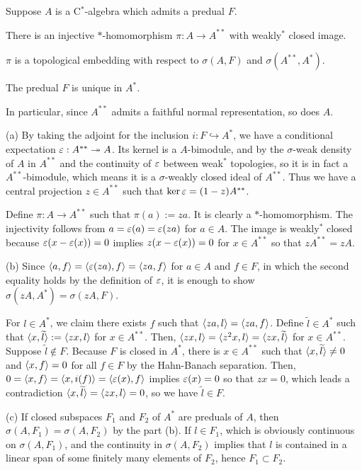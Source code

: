 \documentclass{../../large}
\begin{document}
\begin{prb}
Suppose $A$ is a C$^*$-algebra which admits a predual $F$.
\begin{parts}
\item There is an injective $*$-homomorphism $\pi:A\to A^{**}$ with weakly$^*$ closed image.
\item $\pi$ is a topological embedding with respect to $\sigma(A,F)$ and $\sigma(A^{**},A^*)$.
\item The predual $F$ is unique in $A^*$.
\end{parts}
In particular, since $A^{**}$ admits a faithful normal representation, so does $A$.
\end{prb}
\begin{pf}
(a)
By taking the adjoint for the inclusion $i:F\hookrightarrow A^*$, we have a conditional expectation $\varepsilon:A^{**}\twoheadrightarrow A$.
Its kernel is a $A$-bimodule, and by the $\sigma$-weak density of $A$ in $A^{**}$ and the continuity of $\varepsilon$ between weak$^*$ topologies, so it is in fact a $A^{**}$-bimodule, which means it is a $\sigma$-weakly closed ideal of $A^{**}$.
Thus we have a central projection $z\in A^{**}$ such that $\ker\varepsilon=(1-z)A^{**}$.

Define $\pi:A\to A^{**}$ such that $\pi(a):=za$.
It is clearly a $*$-homomorphism.
The injectivity follows from $a=\varepsilon(a)=\varepsilon(za)$ for $a\in A$.
The image is weakly$^*$ closed because $\varepsilon(x-\varepsilon(x))=0$ implies $z(x-\varepsilon(x))=0$ for $x\in A^{**}$ so that $zA^{**}=zA$.

(b)
Since $\langle a,f\rangle=\langle\varepsilon(za),f\rangle=\langle za,f\rangle$ for $a\in A$ and $f\in F$, in which the second equality holds by the definition of $\varepsilon$, it is enough to show $\sigma(zA,A^*)=\sigma(zA,F)$.

For $l\in A^*$, we claim there exists $f$ such that $\langle za,l\rangle=\langle za,f\rangle$.
Define $\tilde l\in A^*$ such that $\langle x,\widetilde l\rangle:=\langle zx,l\rangle$ for $x\in A^{**}$.
Then, $\langle zx,l\rangle=\langle z^2x,l\rangle=\langle zx,\widetilde l\rangle$ for $x\in A^{**}$.
Suppose $\tilde l\notin F$.
Because $F$ is closed in $A^*$, there is $x\in A^{**}$ such that $\langle x,\widetilde l\rangle\ne0$ and $\langle x,f\rangle=0$ for all $f\in F$ by the Hahn-Banach separation.
Then, $0=\langle x,f\rangle=\langle x,i(f)\rangle=\langle\varepsilon(x),f\rangle$ implies $\varepsilon(x)=0$ so that $zx=0$, which leads a contradiction $\langle x,\widetilde l\rangle=\langle zx,l\rangle=0$, so we have $\tilde l\in F$.

(c)
If closed subspaces $F_1$ and $F_2$ of $A^*$ are preduals of $A$, then $\sigma(A,F_1)=\sigma(A,F_2)$ by the part (b).
If $l\in F_1$, which is obviously continuous on $\sigma(A,F_1)$, and the continuity in $\sigma(A,F_2)$ implies that $l$ is contained in a linear span of some finitely many elements of $F_2$, hence $F_1\subset F_2$.
\end{pf}
\end{document}
